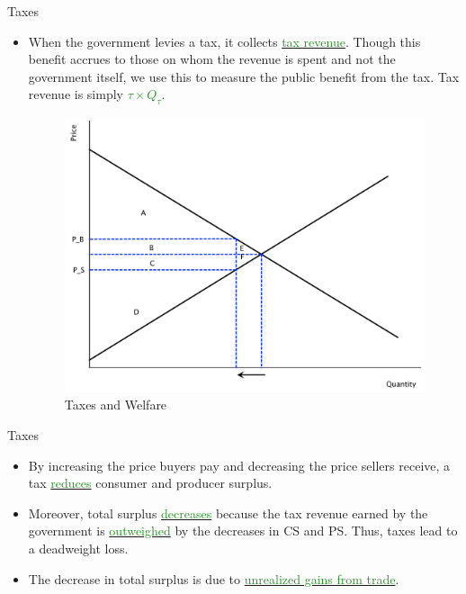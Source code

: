 \documentclass[xcolor={dvipsnames},pdf, hyperref={colorlinks=true, citecolor=ForestGreen, linkcolor=BlueViolet, urlcolor=Magenta}]{beamer}
\newcommand{\dd}[1]{{\underline{\textcolor{ForestGreen}{#1}}}}
\begin{document}
\begin{frame}{Taxes}
	\begin{itemize}
		\item 	When the government levies a tax, it collects \dd{tax revenue}. Though this benefit accrues to those on whom the revenue is spent and not the government itself, we use this to measure the public benefit from the tax. Tax revenue is simply \dd{$\tau \times Q_{\tau}$}. 
		\begin{figure}[H]
			\centering
			\includegraphics[scale=.3]{plot44.pdf}
			\caption{Taxes and Welfare}
		\end{figure}
	\end{itemize}
\end{frame}

\begin{frame}{Taxes}
	\begin{itemize}
		\item By increasing the price buyers pay and decreasing the price sellers receive, a tax \dd{reduces} consumer and producer surplus. 
		\item Moreover, total surplus \dd{decreases} because the tax revenue earned by the government is \dd{outweighed} by the decreases in CS and PS. Thus, taxes lead to a deadweight loss.
		\item The decrease in total surplus is due to \dd{unrealized gains from trade}.
	\end{itemize}
	
\end{frame}
\end{document}
